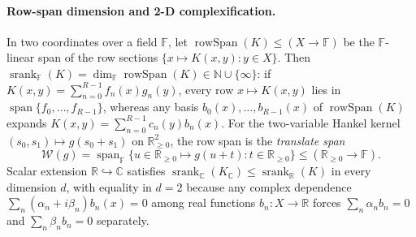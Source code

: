 \documentclass[11pt,a4paper]{article}
\theoremstyle{plain}
\theoremstyle{definition}
\newcommand{\R}{\mathbb{R}}
\newcommand{\C}{\mathbb{C}}
\newcommand{\N}{\mathbb{N}}
\newcommand{\Field}{\mathbb{F}}
\newcommand{\Rnn}{\mathbb{R}_{\ge 0}}
\DeclareMathOperator{\srank}{srank}
\DeclareMathOperator{\spanop}{span}
\begin{document}
\paragraph{Row-span dimension and 2-D complexification.}
In two coordinates over a field $\Field$, let $\operatorname{rowSpan}(K) \le (X \to \Field)$ be the $\Field$-linear span of the row sections $\{x \mapsto K(x, y) : y \in X\}$. Then $\srank_{\Field}(K) = \dim_{\Field}\operatorname{rowSpan}(K) \in \N \cup \{\infty\}$: if $K(x, y) = \sum_{n=0}^{R-1} f_n(x)g_n(y)$, every row $x \mapsto K(x, y)$ lies in $\spanop\{f_0,\dots,f_{R-1}\}$, whereas any basis $b_0(x),\dots,b_{R-1}(x)$ of $\operatorname{rowSpan}(K)$ expands $K(x, y) = \sum_{n=0}^{R-1} c_n(y)b_n(x)$. For the two-variable Hankel kernel $(s_0, s_1) \mapsto g(s_0 + s_1)$ on $\Rnn^2$, the row span is the \emph{translate span}
\[
  \mathcal{W}(g) = \spanop_{\Field}\{u \in \Rnn \mapsto g(u + t) : t \in \Rnn\} \le (\Rnn \to \Field).
\]
Scalar extension $\R \hookrightarrow \C$ satisfies $\srank_{\C}(K_{\C}) \le \srank_{\R}(K)$ in every dimension $d$, with equality in $d = 2$ because any complex dependence $\sum_n (\alpha_n + i\beta_n)b_n(x) = 0$ among real functions $b_n : X \to \R$ forces $\sum_n \alpha_n b_n = 0$ and $\sum_n \beta_n b_n = 0$ separately.
\end{document}

